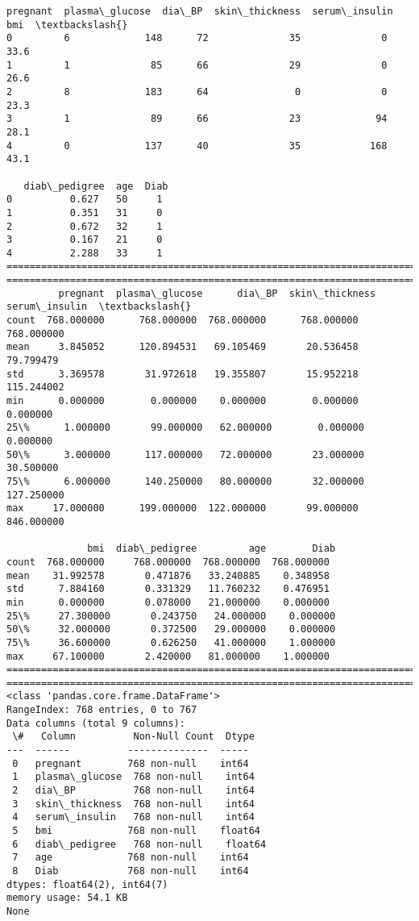 \documentclass[11pt]{article}
\begin{document}
    \begin{Verbatim}[commandchars=\\\{\}]
   pregnant  plasma\_glucose  dia\_BP  skin\_thickness  serum\_insulin   bmi  \textbackslash{}
0         6             148      72              35              0  33.6
1         1              85      66              29              0  26.6
2         8             183      64               0              0  23.3
3         1              89      66              23             94  28.1
4         0             137      40              35            168  43.1

   diab\_pedigree  age  Diab
0          0.627   50     1
1          0.351   31     0
2          0.672   32     1
3          0.167   21     0
4          2.288   33     1
================================================================================
================================================================================
         pregnant  plasma\_glucose      dia\_BP  skin\_thickness  serum\_insulin  \textbackslash{}
count  768.000000      768.000000  768.000000      768.000000     768.000000
mean     3.845052      120.894531   69.105469       20.536458      79.799479
std      3.369578       31.972618   19.355807       15.952218     115.244002
min      0.000000        0.000000    0.000000        0.000000       0.000000
25\%      1.000000       99.000000   62.000000        0.000000       0.000000
50\%      3.000000      117.000000   72.000000       23.000000      30.500000
75\%      6.000000      140.250000   80.000000       32.000000     127.250000
max     17.000000      199.000000  122.000000       99.000000     846.000000

              bmi  diab\_pedigree         age        Diab
count  768.000000     768.000000  768.000000  768.000000
mean    31.992578       0.471876   33.240885    0.348958
std      7.884160       0.331329   11.760232    0.476951
min      0.000000       0.078000   21.000000    0.000000
25\%     27.300000       0.243750   24.000000    0.000000
50\%     32.000000       0.372500   29.000000    0.000000
75\%     36.600000       0.626250   41.000000    1.000000
max     67.100000       2.420000   81.000000    1.000000
================================================================================
================================================================================
<class 'pandas.core.frame.DataFrame'>
RangeIndex: 768 entries, 0 to 767
Data columns (total 9 columns):
 \#   Column          Non-Null Count  Dtype
---  ------          --------------  -----
 0   pregnant        768 non-null    int64
 1   plasma\_glucose  768 non-null    int64
 2   dia\_BP          768 non-null    int64
 3   skin\_thickness  768 non-null    int64
 4   serum\_insulin   768 non-null    int64
 5   bmi             768 non-null    float64
 6   diab\_pedigree   768 non-null    float64
 7   age             768 non-null    int64
 8   Diab            768 non-null    int64
dtypes: float64(2), int64(7)
memory usage: 54.1 KB
None
    \end{Verbatim}
\end{document}
